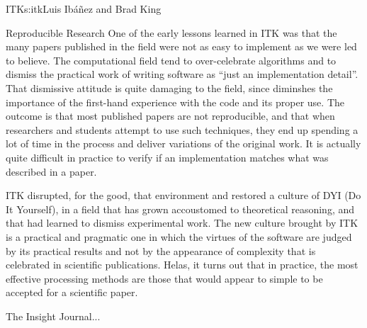 \begin{aosachapter}{ITK}{s:itk}{Luis Ib\'{a}\~{n}ez and Brad King}
\begin{aosasect1}{Reproducible Research}
One of the early lessons learned in ITK was that the many papers
published in the field were not as easy to implement as we were led to
believe. The computational field tend to over-celebrate algorithms and
to dismiss the practical work of writing software as ``just an
implementation detail''. That dismissive attitude is quite damaging to
the field, since diminshes the importance of the first-hand experience
with the code and its proper use. The outcome is that most published papers
are not reproducible, and that when researchers and students attempt to use
such techniques, they end up spending a lot of time in the process and deliver
variations of the original work. It is actually quite difficult in practice
to verify if an implementation matches what was described in a paper.

ITK disrupted, for the good, that environment and restored a culture
of DYI (Do It Yourself), in a field that has grown accoustomed to
theoretical reasoning, and that had learned to dismiss experimental
work. The new culture brought by ITK is a practical and pragmatic one
in which the virtues of the software are judged by its practical results
and not by the appearance of complexity that is celebrated in scientific
publications. Helas, it turns out that in practice, the most effective
processing methods are those that would appear to simple to be accepted
for a scientific paper.

The Insight Journal...
\end{aosasect1}

\end{aosachapter}
